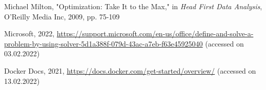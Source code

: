 \documentclass{article}
\begin{document}
\begin{multicols}{2}
\begin{thebibliography}{2}
  Michael Milton, "Optimization: Take It to the Max," in  \textit{Head First Data Analysis}, O'Reilly Media Inc, 2009, pp. 75-109
 
  Microsoft, 2022, \url{https://support.microsoft.com/en-us/office/define-and-solve-a-problem-by-using-solver-5d1a388f-079d-43ac-a7eb-f63e45925040} (accessed on 03.02.2022)


  Docker Docs, 2021, \url{https://docs.docker.com/get-started/overview/} (accessed on 13.02.2022)
 
\end{thebibliography}

\end{multicols}
\end{document}
